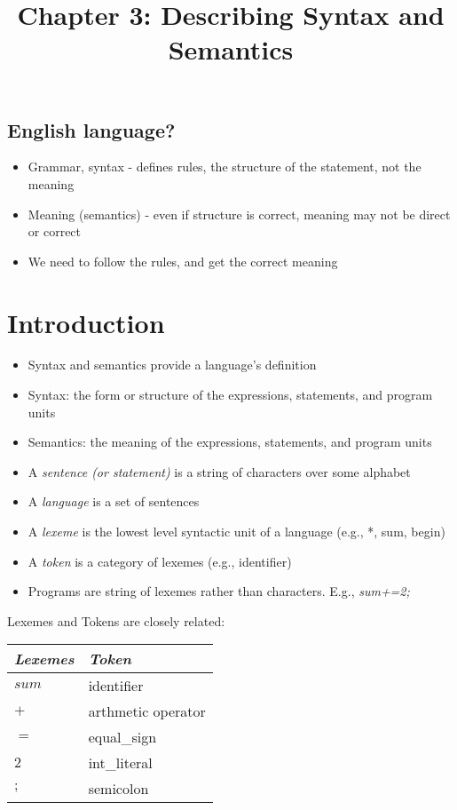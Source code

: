 \documentclass[12pt]{article}
\title{Chapter 3: Describing Syntax and Semantics}
\author{}
\date{}
\begin{document}
\subsection{English language?}

\begin{itemize}
  \item Grammar, syntax - defines rules, the structure of the statement, not the meaning
  \item Meaning (semantics) - even if structure is correct, meaning may not be direct or correct
  \item We need to follow the rules, and get the correct meaning
\end{itemize}

\section{Introduction}

\begin{itemize}
  \item Syntax and semantics provide a language's definition
  \item Syntax: the form or structure of the expressions, statements, and program units
  \item Semantics: the meaning of the expressions, statements, and program units
  \item A \textit{sentence (or statement)} is a string of characters over some alphabet
  \item A \textit{language} is a set of sentences
  \item A \textit{lexeme} is the lowest level syntactic unit of a language (e.g., *, sum, begin)
  \item A \textit{token} is a category of lexemes (e.g., identifier)
  \item Programs are string of lexemes rather than characters. E.g., \textit{sum+=2;}
\end{itemize}

Lexemes and Tokens are closely related:

\begin{tabular}{l l}
  \textit{Lexemes} & \textit{Token} \\ \hline
  $sum$ & identifier \\
  $+$ & arthmetic operator \\
  $=$ & equal\_sign \\
  $2$ & int\_literal \\
  $;$ & semicolon
\end{tabular}
\end{document}
